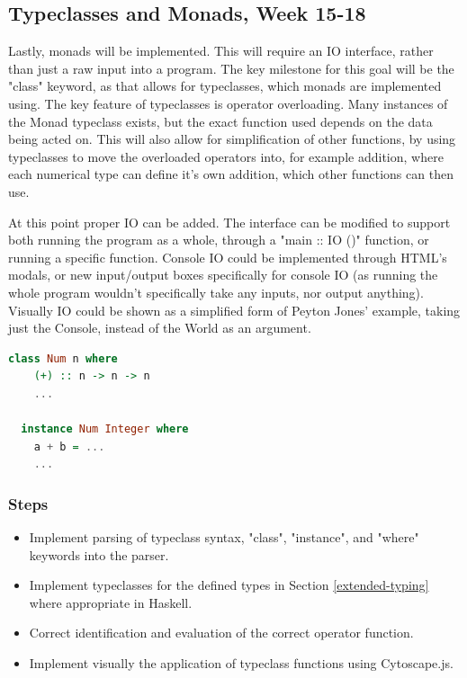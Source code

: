 \documentclass[a4paper]{article}
\begin{document}
\subsection{Typeclasses and Monads, Week 15-18}
Lastly, monads will be implemented. This will require an IO interface, rather than just a raw input into a program. The key milestone for this goal will be the "class" keyword, as that allows for typeclasses, which monads are implemented using.
The key feature of typeclasses is operator overloading. Many instances of the Monad typeclass exists, but the exact function used depends on the data being acted on.
This will also allow for simplification of other functions, by using typeclasses to move the overloaded operators into, for example addition, where each numerical type can define it's own addition, which other functions can then use.

At this point proper IO can be added. The interface can be modified to support both running the program as a whole, through a "main :: IO ()" function, or running a specific function. Console IO could be implemented through HTML's modals, or new input/output boxes specifically for console IO (as running the whole program wouldn't specifically take any inputs, nor output anything). Visually IO could be shown as a simplified form of Peyton Jones' example, taking just the Console, instead of the World as an argument.
\begin{lstlisting}[language=haskell, caption=The Num typeclass. (+) would be implemented in JavaScript.]
  class Num n where
    (+) :: n -> n -> n
    ...

  instance Num Integer where
    a + b = ...
    ...
\end{lstlisting}
\subsubsection{Steps}
\begin{itemize}
    \item Implement parsing of typeclass syntax, "class", "instance", and "where" keywords into the parser.
    \item Implement typeclasses for the defined types in Section \ref{extended-typing} where appropriate in Haskell.
    \item Correct identification and evaluation of the correct operator function.
    \item Implement visually the application of typeclass functions using Cytoscape.js.
\end{itemize}
\printbibliography
\end{document}
